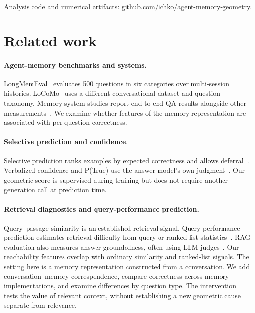 \documentclass{article}
\begin{document}
\noindent Analysis code and numerical artifacts:
\href{https://github.com/ichko/agent-memory-geometry}{github.com/ichko/agent-memory-geometry}.

\section{Related work}

\paragraph{Agent-memory benchmarks and systems.}
LongMemEval~\citep{wu2025longmemeval} evaluates 500 questions in six categories
over multi-session histories. LoCoMo~\citep{maharana2024locomo} uses a different
conversational dataset and question taxonomy.
Memory-system studies report end-to-end QA results alongside other
measurements~\citep{chhikara2025mem0,rasmussen2025zep}.
We examine whether features of the memory representation are associated with
per-question correctness.

\paragraph{Selective prediction and confidence.}
Selective prediction ranks examples by expected correctness and allows
deferral~\citep{hendrycks2017baseline,geifman2017selective}.
Verbalized confidence and P(True) use the answer model's own
judgment~\citep{kadavath2022know}. Our geometric score is supervised during
training but does not require another generation call at prediction time.

\paragraph{Retrieval diagnostics and query-performance prediction.}
Query--passage similarity is an established retrieval signal.
Query-performance prediction estimates retrieval difficulty from query or
ranked-list statistics~\citep{cronentownsend2002predicting,carmel2010estimating}.
RAG evaluation also measures answer groundedness, often using LLM
judges~\citep{es2024ragas,saadfalcon2024ares}.
Our reachability features overlap with ordinary similarity and ranked-list
signals. The setting here is a memory representation constructed from a
conversation. We add conversation--memory correspondence, compare correctness
across memory implementations, and examine differences by question type.
The intervention tests the value of relevant context, without establishing
a new geometric cause separate from relevance.
\end{document}
